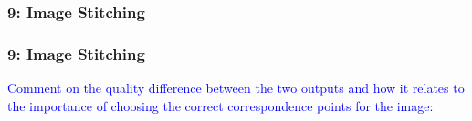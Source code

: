 \documentclass[../report.tex]{subfiles}
\begin{document}
    
    \begin{frame}
        \frametitle{9: Image Stitching}
        \begin{figure}[!htb]
            \centering
            \subfloat[\small{ps3-9-1}]{\frame{\texttt{[image: ps3-9-1]}}} \hspace{3em}
            \subfloat[\small{ps3-9-2}]{\frame{\texttt{[image: ps3-9-2]}}}
        \end{figure}
    \end{frame}

    \begin{frame}
        \frametitle{9: Image Stitching}
        \selectfont\textcolor{blue}{Comment on the quality difference between the two outputs and how it relates to the importance of choosing the correct correspondence points for the image:} \\
                
        \vspace*{\fill}
    \end{frame}
    
\end{document}
